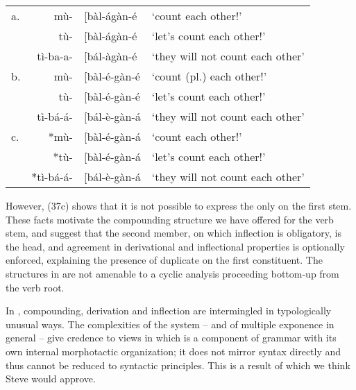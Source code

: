 \documentclass[output=paper,
modfonts
]{LSP/langsci}
\begin{document}
\ea \label{ex:hyman:37}\begin{tabular}[t]{@{}lr@{}ll}
a. & mù- & {[}bàl-ágàn-é & `count each other!' \\
 & tù- &{[}bàl-ágàn-é & `let's count each other!' \\
 & tì-ba-a- &{[}bál-àgàn-é  & `they will not count each other' \\
b. & mù- &{[}bàl-é-gàn-é & `count (pl.) each other!' \\
 & tù- &{[}bàl-é-gàn-é & `let's count each other!' \\
 & tì-bá-á- &{[}bál-è-gàn-á & `they will not count each other'\\
c. & *mù- &{[}bàl-é-gàn-á & `count each other!' \\
 & *tù- &{[}bàl-é-gàn-á & `let's count each other!' \\
 & *tì-bá-á- &{[}bál-è-gàn-á & `they will not count each other'
\end{tabular}
\z

\noindent However, (37c) shows that it is not possible to express the 
only on the first stem. These facts motivate the compounding structure
we have offered for the  verb stem, and suggest that the second
member, on which inflection is obligatory, is the head, and agreement in
derivational and inflectional properties is optionally enforced,
explaining the presence of duplicate  on the first
constituent. The structures in  are not amenable to a cyclic
analysis proceeding bottom-up from the verb root.

In , compounding, derivation and inflection are intermingled in
typologically unusual ways. The complexities of the system -- and of multiple exponence in general \citep[21]{dimensions} --  give credence
to views in which  is a component of grammar with its own
internal morphotactic organization; it does not mirror syntax directly
and thus cannot be reduced to syntactic principles. This is a result of
which we think Steve would approve.



{\sloppy
\printbibliography[heading=subbibliography,notkeyword=this]
}
\end{document}
